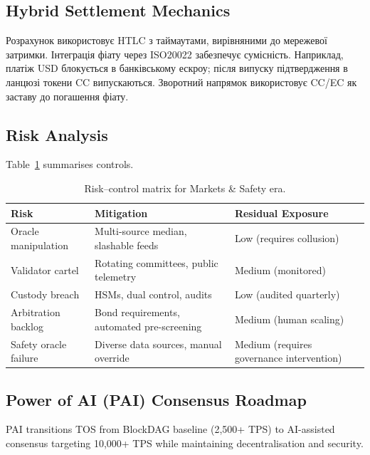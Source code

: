 \documentclass[11pt]{article}
\begin{document}
\subsection{Hybrid Settlement Mechanics}
Розрахунок використовує HTLC з таймаутами, вирівняними до мережевої затримки. Інтеграція фіату через ISO20022 забезпечує сумісність. Наприклад, платіж USD блокується в банківському ескроу; після випуску підтвердження в ланцюзі токени CC випускаються. Зворотний напрямок використовує CC/EC як заставу до погашення фіату.

\subsection{Risk Analysis}
Table~\ref{tab:risk-markets} summarises controls.

\begin{table}[H]
  \centering
  \begin{tabular}{p{}p{}p{}}
    \toprule
    \textbf{Risk} & \textbf{Mitigation} & \textbf{Residual Exposure} \\
    \midrule
    Oracle manipulation & Multi-source median, slashable feeds & Low (requires collusion) \\
    Validator cartel & Rotating committees, public telemetry & Medium (monitored) \\
    Custody breach & HSMs, dual control, audits & Low (audited quarterly) \\
    Arbitration backlog & Bond requirements, automated pre-screening & Medium (human scaling) \\
    Safety oracle failure & Diverse data sources, manual override & Medium (requires governance intervention) \\
    \bottomrule
  \end{tabular}
  \caption{Risk--control matrix for Markets \& Safety era.}
  \label{tab:risk-markets}
\end{table}

\subsection{Power of AI (PAI) Consensus Roadmap}
\label{sec:pai-roadmap}
PAI transitions TOS from BlockDAG baseline (2,500+ TPS) to AI-assisted consensus targeting 10,000+ TPS while maintaining decentralisation and security.
\end{document}
